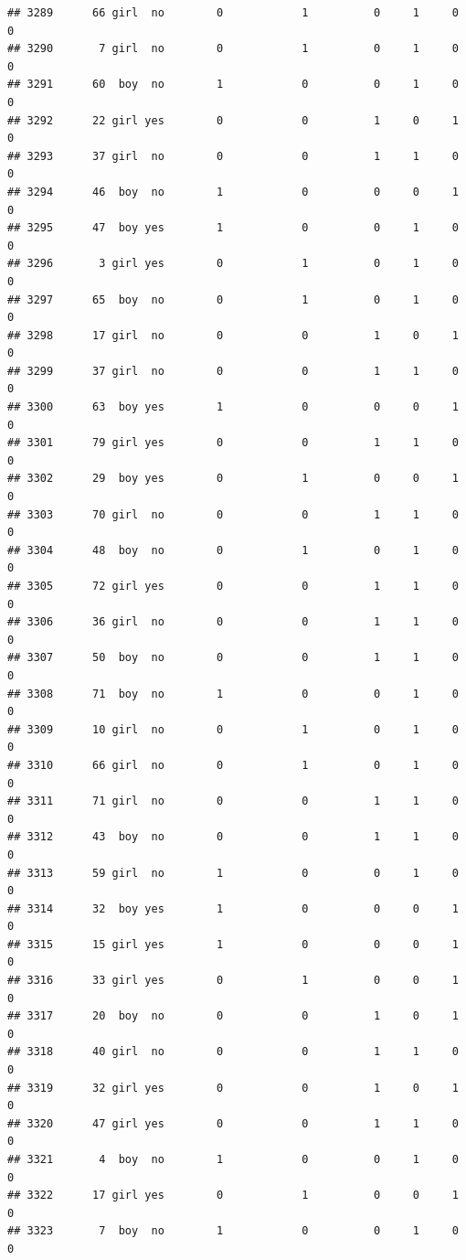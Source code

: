 \documentclass[man]{apa6}
\begin{document}
\begin{verbatim}
## 3289      66 girl  no        0            1          0     1     0     0
## 3290       7 girl  no        0            1          0     1     0     0
## 3291      60  boy  no        1            0          0     1     0     0
## 3292      22 girl yes        0            0          1     0     1     0
## 3293      37 girl  no        0            0          1     1     0     0
## 3294      46  boy  no        1            0          0     0     1     0
## 3295      47  boy yes        1            0          0     1     0     0
## 3296       3 girl yes        0            1          0     1     0     0
## 3297      65  boy  no        0            1          0     1     0     0
## 3298      17 girl  no        0            0          1     0     1     0
## 3299      37 girl  no        0            0          1     1     0     0
## 3300      63  boy yes        1            0          0     0     1     0
## 3301      79 girl yes        0            0          1     1     0     0
## 3302      29  boy yes        0            1          0     0     1     0
## 3303      70 girl  no        0            0          1     1     0     0
## 3304      48  boy  no        0            1          0     1     0     0
## 3305      72 girl yes        0            0          1     1     0     0
## 3306      36 girl  no        0            0          1     1     0     0
## 3307      50  boy  no        0            0          1     1     0     0
## 3308      71  boy  no        1            0          0     1     0     0
## 3309      10 girl  no        0            1          0     1     0     0
## 3310      66 girl  no        0            1          0     1     0     0
## 3311      71 girl  no        0            0          1     1     0     0
## 3312      43  boy  no        0            0          1     1     0     0
## 3313      59 girl  no        1            0          0     1     0     0
## 3314      32  boy yes        1            0          0     0     1     0
## 3315      15 girl yes        1            0          0     0     1     0
## 3316      33 girl yes        0            1          0     0     1     0
## 3317      20  boy  no        0            0          1     0     1     0
## 3318      40 girl  no        0            0          1     1     0     0
## 3319      32 girl yes        0            0          1     0     1     0
## 3320      47 girl yes        0            0          1     1     0     0
## 3321       4  boy  no        1            0          0     1     0     0
## 3322      17 girl yes        0            1          0     0     1     0
## 3323       7  boy  no        1            0          0     1     0     0

\end{verbatim}
\end{document}
